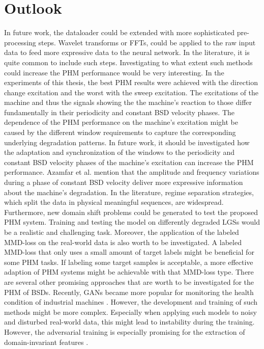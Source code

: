 \chapter{Outlook}
In future work, the dataloader could be extended with more sophisticated pre-processing steps. Wavelet transforms or FFTs, could be applied to the raw input data to feed more expressive data to the neural network. In the literature, it is quite common to include such steps. Investigating to what extent such methods could increase the PHM performance would be very interesting.
In the experiments of this thesis, the best PHM results were achieved with the direction change excitation and the worst with the sweep excitation. The excitations of the machine and thus the signals showing the the machine's reaction to those differ fundamentally in their periodicity and constant BSD velocity phases. The dependence of the PHM performance on the machine's excitation might be caused by the different window requirements to capture the corresponding underlying degradation patterns. In future work, it should be investigated how the adaptation and synchronization of the windows to the periodicity and constant BSD velocity phases of the machine's excitation can increase the PHM performance. Azamfar et al. \cite{AZAMFAR2020103932} mention that the amplitude and frequency variations during a phase of constant BSD velocity deliver more expressive information about the machine's degradation. In the literature, regime separation strategies, which split the data in physical meaningful sequences, are widespread.
Furthermore, new domain shift problems could be generated to test the proposed PHM system. Training and testing the model on differently degraded LGSs would be a realistic and challenging task.
Moreover, the application of the labeled MMD-loss on the real-world data is also worth to be investigated. A labeled MMD-loss that only uses a small amount of target labels might be beneficial for some PHM tasks.  If labeling some target samples is acceptable, a more effective adaption of PHM systems might be achievable with that MMD-loss type.
There are several other promising approaches that are worth to be investigated for the PHM of BSDs. Recently, GANs became more popular for monitoring the health condition of industrial machines \cite{Zhang2019}. However, the development and training of such methods might be more complex. Especially when applying such models to noisy and disturbed real-world data, this might lead to instability during the training. However, the adversarial training is especially promising for the extraction of domain-invariant features \cite{Zhang2019}. 



